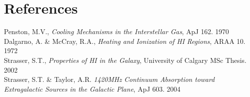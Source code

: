 \documentclass{article}
\begin{document}
\section*{References}
Penston, M.V., \textit{Cooling Mechanisms in the Interstellar Gas}, ApJ 162.
1970\\
Dalgarno, A. \& McCray, R.A., \textit{Heating and Ionization of HI Regions},
ARAA 10. 1972\\
Strasser, S.T., \textit{Properties of HI in the Galaxy}, University of Calgary
MSc Thesis. 2002\\
Strasser, S.T. \& Taylor, A.R. \textit{1420MHz Continuum Absorption toward
Extragalactic Sources in the Galactic Plane}, ApJ 603. 2004
\\
\\
\end{document}
